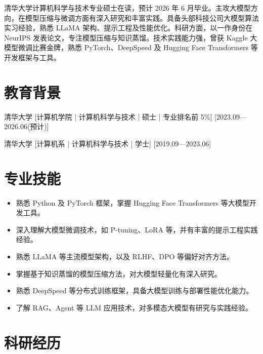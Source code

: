 \documentclass{resume-photo}
\begin{document}

\ResumeTitle


\noindent 清华大学计算机科学与技术专业硕士在读，预计 2026 年 6 月毕业。主攻大模型方向，在模型压缩与微调方面有深入研究和丰富实践。具备头部科技公司大模型算法实习经验，熟悉 LLaMA 架构、提示工程及性能优化。科研方面，以一作身份在 NeurIPS 发表论文，专注模型压缩与知识蒸馏。技术实践能力强，曾获 Kaggle 大模型微调比赛金牌，熟悉 PyTorch、DeepSpeed 及 Hugging Face Transformers 等开发框架与工具。


\section{教育背景}
\ResumeItem
{清华大学}
[\textnormal{计算机学院 | 计算机科学与技术 | 硕士 | 专业排名前 5\%}]
[2023.09—2026.06(预计)]

\ResumeItem
{清华大学}
[\textnormal{计算机系 | 计算机科学与技术 | 学士}]
[2019.09—2023.06]

\section{专业技能}
\begin{itemize}
  \item 熟悉 Python 及 PyTorch 框架，掌握 Hugging Face Transformers 等大模型开发工具。
  \item 深入理解大模型微调技术，如 P-tuning、LoRA 等，并有丰富的提示工程实践经验。
  \item 熟悉 LLaMA 等主流模型架构，以及 RLHF、DPO 等偏好对齐方法。
  \item 掌握基于知识蒸馏的模型压缩方法，对大模型轻量化有深入研究。
  \item 熟悉 DeepSpeed 等分布式训练框架，具备大模型训练与部署性能优化能力。
  \item 了解 RAG、Agent 等 LLM 应用技术，对多模态大模型有研究与实践经验。
\end{itemize}

\section{科研经历}
\end{document}
